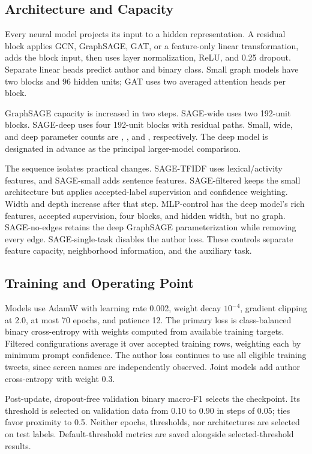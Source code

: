 \documentclass[conference]{IEEEtran}
\begin{document}
\subsection{Architecture and Capacity}
Every neural model projects its input to a hidden representation. A residual block applies GCN, GraphSAGE, GAT, or a feature-only linear transformation, adds the block input, then uses layer normalization, ReLU, and 0.25 dropout. Separate linear heads predict author and binary class. Small graph models have two blocks and 96 hidden units; GAT uses two averaged attention heads per block.

GraphSAGE capacity is increased in two steps. SAGE-wide uses two 192-unit blocks. SAGE-deep uses four 192-unit blocks with residual paths. Small, wide, and deep parameter counts are \SmallParameters{}, \WideParameters{}, and \LargeParameters{}, respectively. The deep model is designated in advance as the principal larger-model comparison.

The sequence isolates practical changes. SAGE-TFIDF uses lexical/activity features, and SAGE-small adds sentence features. SAGE-filtered keeps the small architecture but applies accepted-label supervision and confidence weighting. Width and depth increase after that step. MLP-control has the deep model's rich features, accepted supervision, four blocks, and hidden width, but no graph. SAGE-no-edges retains the deep GraphSAGE parameterization while removing every edge. SAGE-single-task disables the author loss. These controls separate feature capacity, neighborhood information, and the auxiliary task.

\subsection{Training and Operating Point}
Models use AdamW with learning rate 0.002, weight decay $10^{-4}$, gradient clipping at 2.0, at most 70 epochs, and patience 12. The primary loss is class-balanced binary cross-entropy with weights computed from available training targets. Filtered configurations average it over \NumFilteredTrain{} accepted training rows, weighting each by minimum prompt confidence. The author loss continues to use all eligible training tweets, since screen names are independently observed. Joint models add author cross-entropy with weight 0.3.

Post-update, dropout-free validation binary macro-F1 selects the checkpoint. Its threshold is selected on validation data from 0.10 to 0.90 in steps of 0.05; ties favor proximity to 0.5. Neither epochs, thresholds, nor architectures are selected on test labels. Default-threshold metrics are saved alongside selected-threshold results.
\end{document}
